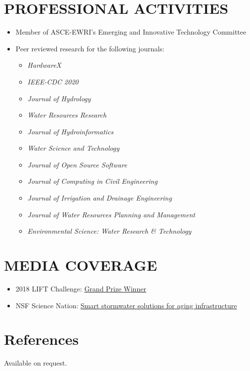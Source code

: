 \documentclass{my_cv}
\begin{document}
\section*{PROFESSIONAL ACTIVITIES}
\begin{itemize}
	\item Member of ASCE-EWRI's Emerging and Innovative Technology Committee
	\item Peer reviewed research for the following journals: 
	\begin{itemize}
		\item \textit{HardwareX}
		\item \textit{IEEE-CDC 2020}
		\item \textit{Journal of Hydrology}
		\item \textit{Water Resources Research}
		\item \textit{Journal of Hydroinformatics}
		\item \textit{Water Science and Technology}
		\item \textit{Journal of Open Source Software}
		\item \textit{Journal of Computing in Civil Engineering}
		\item \textit{Journal of Irrigation and Drainage Engineering}
		\item \textit{Journal of Water Resources Planning and Management}
		\item \textit{Environmental Science: Water Research \& Technology}
	\end{itemize}
\end{itemize}

\section*{MEDIA COVERAGE}
\begin{itemize}
	\item 2018 LIFT Challenge: \href{https://cee.engin.umich.edu/stories/joint-u-m-and-glwa-team-wins-inaugural-intelligent-water-challenge/}{Grand Prize Winner}
	\item NSF Science Nation: \href{https://www.youtube.com/watch?v=mStPThxAU08}{Smart stormwater solutions for aging infrastructure}
\end{itemize}

\section*{References}
Available on request. 
\end{document}
